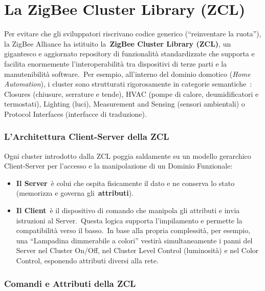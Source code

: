 \documentclass[
  italian,
  openany]{book}
\begin{document}
\section{La ZigBee Cluster Library
(ZCL)}\label{la-zigbee-cluster-library-zcl}

Per evitare che gli sviluppatori riscrivano codice generico
(``reinventare la ruota''), la ZigBee Alliance ha istituito
la~\textbf{ZigBee Cluster Library (ZCL)}, un gigantesco e aggiornato
repository di funzionalità standardizzate che supporta e facilita
enormemente l'interoperabilità tra dispositivi di terze parti e la
manutenibilità software.~Per esempio, all'interno del dominio domotico
(\emph{Home Automation}), i cluster sono strutturati rigorosamente in
categorie semantiche~: Closures (chiusure, serrature e tende), HVAC
(pompe di calore, deumidificatori e termostati), Lighting (luci),
Measurement and Sensing (sensori ambientali) o Protocol Interfaces
(interfacce di traduzione).

\subsubsection{L'Architettura Client-Server della
ZCL}\label{larchitettura-client-server-della-zcl}

Ogni cluster introdotto dalla ZCL poggia saldamente su un modello
gerarchico Client-Server per l'accesso e la manipolazione di un Dominio
Funzionale:

\begin{itemize}
\item
  \textbf{Il Server}~è colui che ospita fisicamente il dato e ne
  conserva lo stato (memorizza e governa gli~\textbf{attributi}).
\item
  \textbf{Il Client}~è il dispositivo di comando che manipola gli
  attributi e invia istruzioni al Server.~Questa logica supporta
  l'impilamento e permette la compatibilità verso il basso.~In base alla
  propria complessità, per esempio, una ``Lampadina dimmerabile a
  colori'' vestirà simultaneamente i panni del Server nel Cluster
  On/Off, nel Cluster Level Control (luminosità) e nel Color Control,
  esponendo attributi diversi alla rete.
\end{itemize}

\subsubsection{Comandi e Attributi della
ZCL}\label{comandi-e-attributi-della-zcl}
\end{document}
